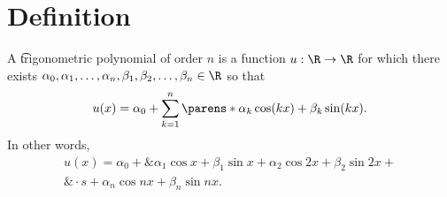 
\section*{Definition}

A \t{trigonometric polynomial} of order $n$ is a function $u: \R  \to \R $ for which there exists $\alpha _0, \alpha _1, \dots , \alpha _n, \beta _1, \beta _2, \dots , \beta _n \in \R $ so that
    \[
u(x) = \alpha _0 + \sum_{k = 1}^{n} \parens*{\alpha _k \cos(kx) + \beta _k \sin(kx)}.
    \]
In other words,
    \[
\begin{aligned}
u(x) = \alpha _0 +\& \alpha _1\cos x + \beta _1\sin x + \alpha _2 \cos2x + \beta _2 \sin2x + \\ \&\cdot s + \alpha _n \cos nx + \beta _n \sin nx.
\end{aligned}
    \]

\blankpage